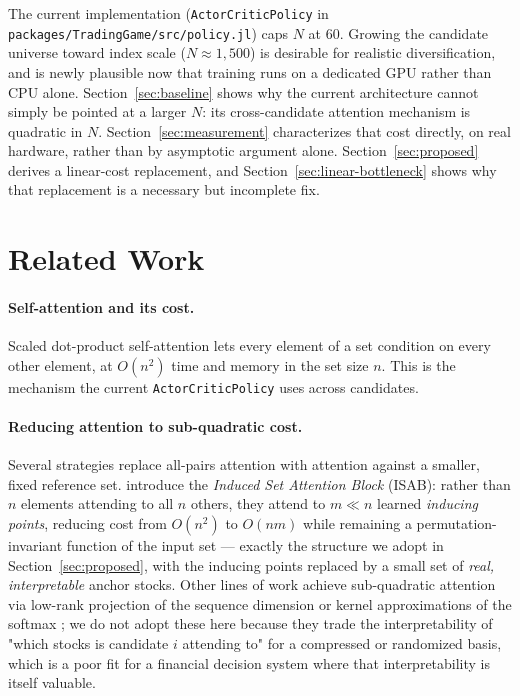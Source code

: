 \documentclass[11pt]{article}
\newcommand{\code}[1]{\texttt{#1}}
\begin{document}
The current implementation (\code{ActorCriticPolicy} in
\code{packages/TradingGame/src/policy.jl}) caps $N$ at 60. Growing the
candidate universe toward index scale ($N \approx 1{,}500$) is desirable for
realistic diversification, and is newly plausible now that training runs on
a dedicated GPU rather than CPU alone. Section~\ref{sec:baseline} shows why
the current architecture cannot simply be pointed at a larger $N$: its
cross-candidate attention mechanism is quadratic in $N$. Section~\ref{sec:measurement}
characterizes that cost directly, on real hardware, rather than by asymptotic
argument alone. Section~\ref{sec:proposed} derives a linear-cost
replacement, and Section~\ref{sec:linear-bottleneck} shows why that
replacement is a necessary but incomplete fix.

\section{Related Work}
\label{sec:related}

\paragraph{Self-attention and its cost.} Scaled dot-product self-attention
\citep{vaswani2017attention} lets every element of a set condition on every
other element, at $O(n^2)$ time and memory in the set size $n$. This is the
mechanism the current \texttt{ActorCriticPolicy} uses across candidates.

\paragraph{Reducing attention to sub-quadratic cost.} Several strategies
replace all-pairs attention with attention against a smaller, fixed
reference set. \citet{lee2019settransformer} introduce the \emph{Induced Set
Attention Block} (ISAB): rather than $n$ elements attending to all $n$
others, they attend to $m \ll n$ learned \emph{inducing points}, reducing
cost from $O(n^2)$ to $O(nm)$ while remaining a permutation-invariant
function of the input set --- exactly the structure we adopt in
Section~\ref{sec:proposed}, with the inducing points replaced by a
small set of \emph{real, interpretable} anchor stocks. Other lines of work
achieve sub-quadratic attention via low-rank projection of the sequence
dimension \citep{wang2020linformer} or kernel approximations of the softmax
\citep{choromanski2021performer}; we do not adopt these here because they
trade the interpretability of "which stocks is candidate $i$ attending to"
for a compressed or randomized basis, which is a poor fit for a financial
decision system where that interpretability is itself valuable.
\end{document}
